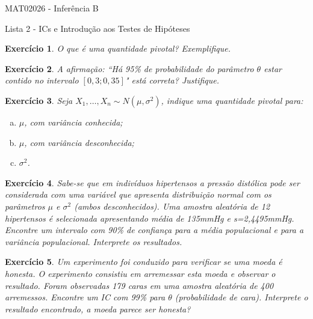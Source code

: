 \documentclass[letter,11pt]{article}
\newtheorem{exer}{Exercício}
\begin{document}
\begin{center}{ \Large MAT02026 - Inferência B }\end{center}

\begin{center}
{\large  \sc Lista 2 - ICs e Introdução aos Testes de Hipóteses}
\end{center}
\vspace{5mm}

\begin{exer} \rm
O que é uma quantidade pivotal? Exemplifique.
\end{exer}


\begin{exer} \rm
A afirmação: ``Há 95\% de probabilidade do parâmetro $\theta$ estar contido no intervalo $[0,3 ; 0,35]$" está correta? Justifique.
\end{exer}

\begin{exer} \rm
Seja $X_1, \ldots, X_n \sim N(\mu, \sigma^2)$, indique uma quantidade pivotal para:

\begin{enumerate}[a)] 

\item $\mu$, com variância conhecida;

\item $\mu$, com variância desconhecida;

\item $\sigma^2$.

\end{enumerate}
\end{exer}


\begin{exer} \rm
 Sabe-se que em indivíduos hipertensos a pressão distólica pode ser considerada com uma variável que apresenta distribuição normal com os parâmetros $\mu$ e $\sigma^2$ (ambos   desconhecidos). Uma amostra aleatória de 12 hipertensos é selecionada apresentando média de 135mmHg e s=2,4495mmHg. Encontre um intervalo com 90\% de confiança para a média populacional e para a variância populacional. Interprete os resultados.
\end{exer}


\begin{exer} \rm
 Um experimento foi conduzido para verificar se uma moeda é honesta. O experimento consistiu em arremessar esta moeda e observar o resultado. Foram observadas 179 caras em uma amostra aleatória de 400 arremessos. Encontre um IC com 99\% para $\theta$ (probabilidade de cara). Interprete o resultado encontrado,  a moeda parece ser honesta?
\end{exer}
\end{document}
